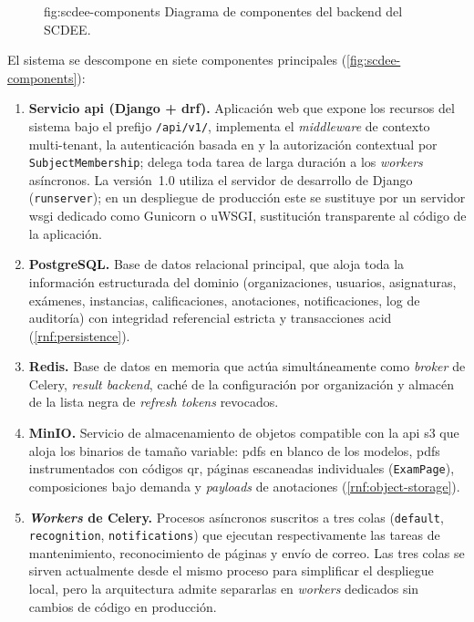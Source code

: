 \begin{figure}[Diagrama de componentes del SCDEE]%
              {fig:scdee-components}%
              {Diagrama de componentes del backend del SCDEE.}
\end{figure}

El sistema se descompone en siete componentes principales
(\cref{fig:scdee-components}):

\begin{enumerate}

  \item \textbf{Servicio \acs{api} (Django + \acs{drf}).}
  Aplicación web que expone los recursos del sistema bajo el prefijo
  \texttt{/api/v1/}, implementa el \textit{middleware} de contexto
  multi-tenant, la autenticación basada en  y la
  autorización contextual por \texttt{SubjectMembership}; delega toda
  tarea de larga duración a los \textit{workers} asíncronos. La
  versión~1.0 utiliza el servidor de desarrollo de Django
  (\texttt{runserver}); en un despliegue de producción este se sustituye
  por un servidor \acs{wsgi} dedicado como Gunicorn o uWSGI, sustitución
  transparente al código de la aplicación.

  \item \textbf{PostgreSQL.}
  Base de datos relacional principal, que aloja toda la información
  estructurada del dominio (organizaciones, usuarios, asignaturas,
  exámenes, instancias, calificaciones, anotaciones, notificaciones, log
  de auditoría) con integridad referencial estricta y transacciones
  \acs{acid} (\cref{rnf:persistence}).

  \item \textbf{Redis.}
  Base de datos en memoria que actúa simultáneamente como \textit{broker}
  de Celery, \textit{result backend}, caché de la configuración por
  organización y almacén de la lista negra de \textit{refresh tokens}
  revocados.

  \item \textbf{MinIO.}
  Servicio de almacenamiento de objetos compatible con la \ac{api}
  \ac{s3} que aloja los binarios de tamaño variable: \acsp{pdf} en blanco
  de los modelos, \acsp{pdf} instrumentados con códigos \acs{qr}, páginas
  escaneadas individuales (\texttt{ExamPage}), composiciones bajo demanda
  y \textit{payloads} de anotaciones (\cref{rnf:object-storage}).

  \item \textbf{\textit{Workers} de Celery.}
  Procesos asíncronos suscritos a tres colas
  (\texttt{default}, \texttt{recognition}, \texttt{notifications}) que
  ejecutan respectivamente las tareas de mantenimiento, reconocimiento
  de páginas y envío de correo. Las tres colas se sirven actualmente
  desde el mismo proceso para simplificar el despliegue local, pero la
  arquitectura admite separarlas en \textit{workers} dedicados sin
  cambios de código en producción.


\end{enumerate}
